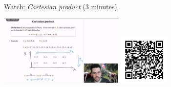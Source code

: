 
\begin{minipage}{10cm}
    \href{https://act4e-spring21.netlify.app/videos/spring2021-products:products:cart-prod.html}{Watch: \emph{Cartesian product} (3 minutes).}
        
    \href{https://act4e-spring21.netlify.app/videos/spring2021-products:products:cart-prod.html}{\includegraphics[height=3.5cm]{spring2021-products:products:cart-prod/thumbnails.jpg}}
    \href{https://act4e-spring21.netlify.app/videos/spring2021-products:products:cart-prod.html}{\includegraphics[height=2.5cm]{spring2021-products:products:cart-prod/qrcode.png}}
\end{minipage}

